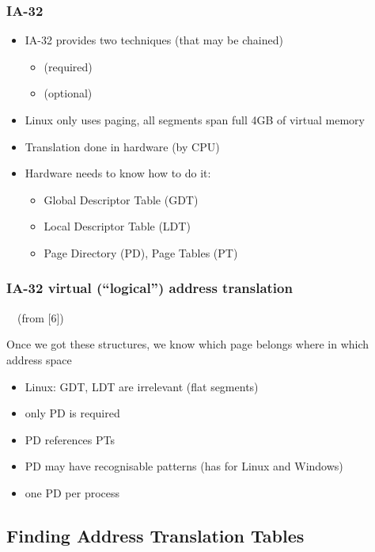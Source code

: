 \documentclass{beamer}
\begin{document}
		\begin{frame} \frametitle{IA-32}
			\begin{itemize}
				\item IA-32 provides two techniques (that may be chained)
				\begin{itemize}
					\item {} (required)
					\item {} (optional)
				\end{itemize}
				\item Linux only uses paging, all segments span full 4GB of virtual memory

				\item Translation done in hardware (by CPU)
				\item Hardware needs to know how to do it:
				\begin{itemize}
					\item Global Descriptor Table (GDT)
					\item Local Descriptor Table (LDT)
					\item Page Directory (PD), Page Tables (PT)
				\end{itemize}
			\end{itemize}
		\end{frame}

		\begin{frame} \frametitle{IA-32 virtual (``logical'') address translation}
			 ~~(from [6])
		\end{frame}

		\begin{frame}
			Once we got these structures,
			we know which page belongs where in which address space
			\begin{itemize}
				\item Linux: GDT, LDT are irrelevant (flat segments)
				\item only PD is required
				\item PD references PTs
				\item<2-> PD may have recognisable patterns (has for Linux and Windows)
				\item<2-> one PD per process
			\end{itemize}
		\end{frame}
	
	\subsection{Finding Address Translation Tables}
		
\end{document}
